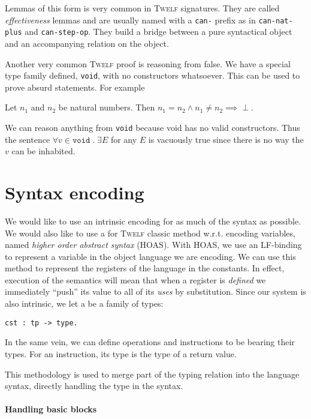 \documentclass[a4paper, oneside, 10pt, draft]{memoir}
\newcommand{\twelf}{\textsc{Twelf}}
\newcommand{\bottom}{\perp}
\begin{document}
Lemmas of this form is very common in \twelf{} signatures. They are
called \emph{effectiveness} lemmas and are usually named with a
\texttt{can-} prefix as in \texttt{can-nat-plus} and
\texttt{can-step-op}. They build a bridge between a pure syntactical
object and an accompanying relation on the object.

Another very common \twelf{} proof is reasoning from false. We have a
special type family defined, \texttt{void}, with no constructors
whatsoever. This can be used to prove absurd statements. For example
\begin{lem}
  Let $n_1$ and $n_2$ be natural numbers. Then $n_1 = n_2 \land n_1
  \neq n_2 \implies \bottom$.
\end{lem}

We can reason anything from \texttt{void} because void has no valid
constructors. Thus the sentence $\forall v \in \texttt{void} \; . \; \exists
E$ for any $E$ is vacuously true since there is no way the $v$ can be
inhabited.

\section{Syntax encoding}

We would like to use an intrinsic encoding for as much of the syntax
as possible. We would also like to use a for \twelf{} classic method
w.r.t. encoding variables, named \emph{higher order abstract syntax}
(HOAS). With HOAS, we use an LF-binding to represent a variable in the
object language we are encoding. We can use this method to represent
the registers of the language in the constants. In effect, execution
of the semantics will mean that when a register is \emph{defined} we
immediately ``push'' its value to all of its \emph{uses} by
substitution. Since our system is also intrinsic, we let a be a family
of types:
\begin{verbatim}
cst : tp -> type.
\end{verbatim}
In the same vein, we can define operations and instructions to be
bearing their types. For an instruction, its type is the type of a
return value.

This methodology is used to merge part of the typing relation into the
language syntax, directly handling the type in the syntax.

\paragraph{Handling basic blocks}
\end{document}
